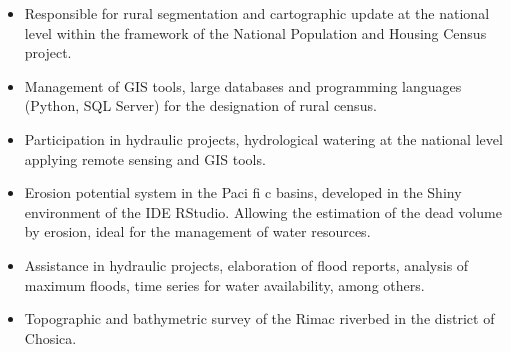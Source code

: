 \documentclass[10pt,a4paper,normalphoto]{altacv}
\begin{document}
\begin{itemize}
\item Responsible for rural segmentation and cartographic update at the national level within the framework of the National Population and Housing Census project.
\item Management of GIS tools, large databases and programming languages (Python, SQL Server) for the designation of rural census.
\end{itemize}
\divider

\begin{itemize}
\item Participation in hydraulic projects, hydrological watering at the national level applying remote sensing and GIS tools.
\item Erosion potential system in the Paci fi c basins, developed in the Shiny environment of the IDE RStudio. Allowing the estimation of the dead volume by erosion, ideal for the management of water resources.
\end{itemize}
\divider


\begin{itemize}
\item Assistance in hydraulic projects, elaboration of flood reports, analysis of maximum floods, time series for water availability, among others.
\item Topographic and bathymetric survey of the Rimac riverbed in the district of Chosica.
\end{itemize}
\divider


\end{document}
